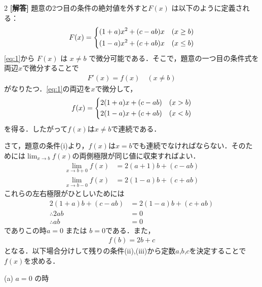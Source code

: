 \documentclass[../../main.tex]{subfiles}
\begin{document}
\setcounter{equation}{0}
\setcounter{figure}{0}
\setcounter{table}{0}
\begin{oframed}
  
\end{oframed}
\setlength{\columnseprule}{0.4pt}
\begin{multicols}{2}
  {\bf [解答]}
  題意の2つ目の条件の絶対値を外すと$F(x)$ は以下のように定義される：
  \begin{align}
    F(x) =
    \begin{dcases}
      (1+a)x^2 + (c-ab)x & (x \ge b) \\
      (1-a)x^2 + (c+ab)x & (x \le b)
    \end{dcases}\label{eq:1}
  \end{align}
  \cref{eq:1}から $F(x)$ は $x\neq b$ で微分可能である．そこで，題意の一つ目の条件式を両辺$x$で微分することで
  \begin{align}
    F'(x) = f(x) \quad (x \ne b)
  \end{align}
  がなりたつ．\cref{eq:1}の両辺を$x$で微分して，
  \begin{align}
    f(x) =
    \begin{dcases}
      2(1+a)x + (c-ab) & (x > b) \\
      2(1-a)x + (c+ab) & (x < b)
    \end{dcases}\label{eq:2}
  \end{align}
  を得る．したがって$f(x)$は$x\neq b$で連続である．

  さて，題意の条件(i)より，$f(x)$は$x=b$でも連続でなければならない．そのためには$\displaystyle \lim_{x\to b} f(x)$の両側極限が同じ値に収束すればよい．
  \begin{align}
    \lim_{x \to b+0} f(x) & = 2(a+1)b + (c-ab) \\
    \lim_{x \to b-0} f(x) & = 2(1-a)b + (c+ab)
  \end{align}
  これらの左右極限がひとしいためには
  \begin{align}
    2(1+a)b + (c-ab) & = 2(1-a)b + (c+ab) \\
    \therefore 2ab   & = 0                \\
    \therefore ab    & = 0
  \end{align}
  でありこの時$a=0$ または $b=0$である．また，
  \begin{align}
    f(b) = 2b+c
  \end{align}
  となる．以下場合分けして残りの条件(ii),(iii)から定数$a$,$b$,$c$を決定することで$f(x)$を求める．

  (a) $a=0$ の時


\end{multicols}
\end{document}
